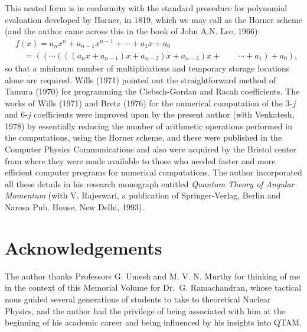 This nested form is in conformity with the standard procedure for polynomial evaluation developed by Horner, in 1819, which we may call as the Horner scheme (and the author came across this in the book of John A.N. Lee, 1966):
\begin{equation}
\begin{split}
& f(x) = a_nx^n + a_{n-1}x^{n-1} + \cdots + a_1x + a_0 \\
& \quad = ((\cdots (((a_nx+ a_{n-1})x + a_{n-2})x + a_{n-3})x + \qquad \cdots + a_1) + a_0), \label{chap7-eq61}
\end{split}
\end{equation}
so that a minimum number of multiplications and temporary storage locations alone are required. Wills (1971) pointed out the straightforward method of Tamura (1970) for programming the Clebsch-Gordan and Racah coefficients. The works of Wills (1971) and Bretz (1976) for the numerical computation of the 3-$j$ and 6-$j$ coefficients were improved upon by the present author (with Venkatesh, 1978) by essentially reducing the number of arithmetic operations performed in the computations, using the Horner scheme, and these were published in the Computer Physics Communications and also were acquired by the Bristol center from where they were made available to those who needed faster and more efficient computer programs for numerical computations. The author incorporated all these details in his research monograph entitled \textit{Quantum Theory of Angular Momentum} (with V. Rajeswari, a publication of Springer-Verlag, Berlin and Narosa Pub. House, New Delhi, 1993).

\section*{Acknowledgements}

The author thanks Professors G. Umesh and M. V. N. Murthy 
for thinking of me in the context of this Memorial Volume for Dr.\ G. Ramachandran, whose tactical nous guided several generations of students to take to theoretical Nuclear Physics, and the author had the privilege of being associated with him at the beginning of his academic career and being influenced by his insights into QTAM.

